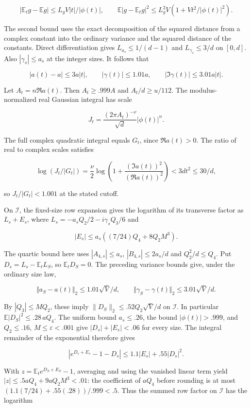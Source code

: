 \documentclass[11pt]{article}
\begin{document}
\[
|\mathbb E_t g-\mathbb E g|\le L_g V |t|/|\phi(t)|,\qquad
\mathbb E|g-\mathbb E_tg|^2
\le L_g^2 V\left(1+Vt^2/|\phi(t)|^2\right).
\]

The second bound uses the exact decomposition of the squared
distance from a complex constant into the ordinary variance
and the squared distance of the constants. Direct differentiation
gives $L_{a_s}\le1/(d-1)$ and $L_{\gamma_s}\le3/d$ on $[0,d]$.
Also $|\gamma_s|\le a_s$ at the integer sizes. It follows that

\[
|a(t)-a|\le 3a|t|,\qquad |\gamma(t)|\le1.01a,\qquad
|\Im\gamma(t)|\le3.01a|t|.
\]

Let $A_t=n\Re a(t)$. Then $A_t\ge.999 A$ and
$A_t/d\ge u/112$. The modulus-normalized real Gaussian integral
has scale

\[
J_t=\frac{(2\pi A_t)^{-\nu}}{\sqrt d}|\phi(t)|^n.
\]

The full complex quadratic integral equals $G_t$, since
$\Re a(t)>0$. The ratio of real to complex scales satisfies

\[
\log(J_t/|G_t|)
=\frac{\nu}{2}\log\left(1+\frac{(\Im a(t))^2}{(\Re a(t))^2}\right)
<3dt^2\le30/d ,
\]

so $J_t/|G_t|<1.001$ at the stated cutoff.

On $\mathcal I$, the fixed-size row expansion gives the logarithm
of its transverse factor as $L_s+E_s$, where
$L_s=-a_sQ_2/2-i\gamma_s Q_3/6$ and

\[
|E_s|\le a_s((7/24)Q_4+8Q_2M^3).
\]

The quartic bound here uses $|A_{4,s}|\le a_s$,
$|B_{4,s}|\le2a_s/d$ and $Q_2^2/d\le Q_4$.
Put $D_s=L_s-\mathbb E_t L_S$, so $\mathbb E_t D_S=0$.
The preceding variance bounds give, under the ordinary size law,

\[
\Vert a_S-a(t)\Vert _2\le1.01\sqrt V/d,\qquad
\Vert \gamma_S-\gamma(t)\Vert _2\le3.01\sqrt V/d.
\]

By $|Q_3|\le M Q_2$, these imply
$\|D_S\|_2\le .52 Q_2\sqrt V/d$ on $\mathcal I$.
In particular $\mathbb E|D_S|^2\le.28\,aQ_4$.
The uniform bound $a_s\le.26$, the bound $|\phi(t)|>.999$,
and $Q_2\le.16$, $M\le\varepsilon<.001$ give
$|D_s|+|E_s|<.06$ for every size. The integral remainder of
the exponential therefore gives

\[
|e^{D_s+E_s}-1-D_s|\le1.1|E_s|+.55|D_s|^2.
\]

With $z=\mathbb E_t e^{D_S+E_S}-1$, averaging and using the
vanished linear term yield $|z|\le .5aQ_4+9aQ_2 M^3<.01$:
the coefficient of $aQ_4$ before rounding is at most
$(1.1(7/24)+.55(.28))/.999<.5$.
Thus the summed row factor on $\mathcal I$ has the logarithm
\end{document}
